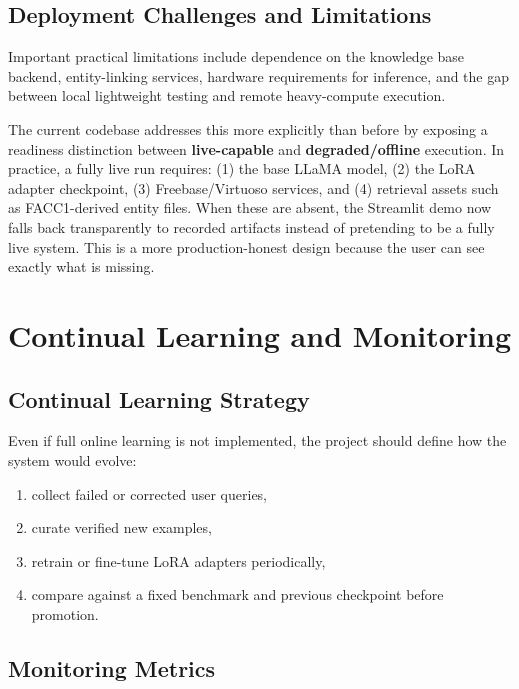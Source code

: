 \documentclass[a4paper,11pt]{article}
\begin{document}
\subsection{Deployment Challenges and Limitations}

Important practical limitations include dependence on the knowledge base backend, entity-linking services, hardware requirements for inference, and the gap between local lightweight testing and remote heavy-compute execution.

\noindent The current codebase addresses this more explicitly than before by exposing a readiness distinction between \textbf{live-capable} and \textbf{degraded/offline} execution. In practice, a fully live run requires: (1) the base LLaMA model, (2) the LoRA adapter checkpoint, (3) Freebase/Virtuoso services, and (4) retrieval assets such as FACC1-derived entity files. When these are absent, the Streamlit demo now falls back transparently to recorded artifacts instead of pretending to be a fully live system. This is a more production-honest design because the user can see exactly what is missing.

\section{Continual Learning and Monitoring}

\subsection{Continual Learning Strategy}

Even if full online learning is not implemented, the project should define how the system would evolve:

\begin{enumerate}[leftmargin=1.4cm]
  \item collect failed or corrected user queries,
  \item curate verified new examples,
  \item retrain or fine-tune LoRA adapters periodically,
  \item compare against a fixed benchmark and previous checkpoint before promotion.
\end{enumerate}

\subsection{Monitoring Metrics}
\end{document}
